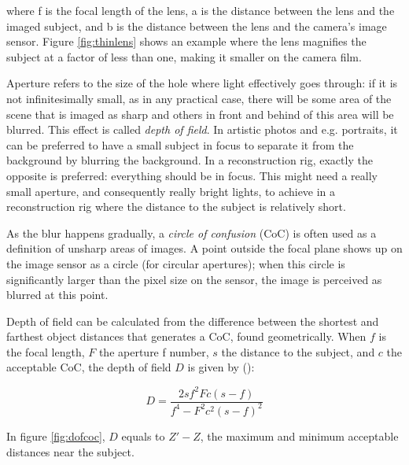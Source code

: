 where f is the focal length of the lens, a is the distance between the lens and the imaged subject, and b is the distance between the lens and the camera's image sensor. Figure \ref{fig:thinlens} shows an example where the lens magnifies the subject at a factor of less than one, making it smaller on the camera film.



Aperture refers to the size of the hole where light effectively goes through: %
if it is not infinitesimally small, as in any practical case, there will be some area of the scene that is imaged as sharp and others in front and behind of this area will be blurred.
This effect is called \emph{depth of field}.
In artistic photos and e.g. portraits, it can be preferred to have a small subject in focus to separate it from the background by blurring the background.
In a reconstruction rig, exactly the opposite is preferred: everything should be in focus.
This might need a really small aperture, and consequently really bright lights, to achieve in a reconstruction rig where the distance to the subject is relatively short.

As the blur happens gradually, a \emph{circle of confusion} (CoC) is often used as a definition of unsharp areas of images.
A point outside the focal plane shows up on the image sensor as a circle (for circular apertures); when this circle is significantly larger than the pixel size on the sensor, the image is perceived as blurred at this point.

Depth of field can be calculated from the difference between the shortest and farthest object distances that generates a CoC, found geometrically.
When $f$ is the focal length, $F$ the aperture f number, $s$ the distance to the subject, and $c$ the acceptable CoC, the depth of field $D$ is given by (\cite{greenleaf1950photographic}):

\begin{equation} \label{eq:dof}
	D = \frac{2 s f^2 F c (s - f)} {f^4 - F^2 c^2 (s - f)^2}
\end{equation}

In figure \ref{fig:dofcoc}, $D$ equals to $Z' - Z$, the maximum and minimum acceptable distances near the subject.

